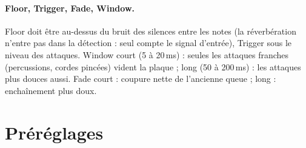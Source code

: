\documentclass[a4paper,11pt]{article}
\begin{document}
\paragraph{Floor, Trigger, Fade, Window.} Floor doit être au-dessus du bruit des silences entre
les notes (la réverbération n'entre pas dans la détection : seul compte le signal d'entrée),
Trigger sous le niveau des attaques. Window court (5 à 20\,ms) : seules les attaques franches
(percussions, cordes pincées) vident la plaque ; long (50 à 200\,ms) : les attaques plus
douces aussi. Fade court : coupure nette de l'ancienne queue ;
long : enchaînement plus doux.

\section{Préréglages}\label{sec:prereglages}
\end{document}
